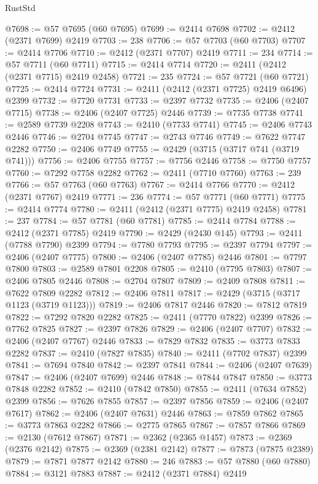 \begin{lexlean}{RustStd}
\begin{coremodule}
@7698 := @57 @7695 (@60 @7695)
@7699 := @2414 @7698
@7702 := @2412 (@2371 @7699) @2419
@7703 := 238
@7706 := @57 @7703 (@60 @7703)
@7707 := @2414 @7706
@7710 := @2412 (@2371 @7707) @2419
@7711 := 234
@7714 := @57 @7711 (@60 @7711)
@7715 := @2414 @7714
@7720 := @2411 (@2412 (@2371 @7715) @2419 @2458)
@7721 := 235
@7724 := @57 @7721 (@60 @7721)
@7725 := @2414 @7724
@7731 := @2411 (@2412 (@2371 @7725) @2419 @6496) @2399
@7732 := @7720 @7731
@7733 := @2397 @7732
@7735 := @2406 (@2407 @7715)
@7738 := @2406 (@2407 @7725) @2446
@7739 := @7735 @7738
@7741 := @2589 @7739 @2208
@7743 := @2410 (@7733 @7741)
@7745 := @2406 @7743 @2446
@7746 := @2704 @7745
@7747 := @2743 @7746
@7749 := @7622 @7747 @2282
@7750 := @2406 @7749
@7755 := @2429 (@3715 (@3717 @741 (@3719 @741)))
@7756 := @2406 @7755
@7757 := @7756 @2446
@7758 := @7750 @7757
@7760 := @7292 @7758 @2282
@7762 := @2411 (@7710 @7760)
@7763 := 239
@7766 := @57 @7763 (@60 @7763)
@7767 := @2414 @7766
@7770 := @2412 (@2371 @7767) @2419
@7771 := 236
@7774 := @57 @7771 (@60 @7771)
@7775 := @2414 @7774
@7780 := @2411 (@2412 (@2371 @7775) @2419 @2458)
@7781 := 237
@7784 := @57 @7781 (@60 @7781)
@7785 := @2414 @7784
@7788 := @2412 (@2371 @7785) @2419
@7790 := @2429 (@2430 @145)
@7793 := @2411 (@7788 @7790) @2399
@7794 := @7780 @7793
@7795 := @2397 @7794
@7797 := @2406 (@2407 @7775)
@7800 := @2406 (@2407 @7785) @2446
@7801 := @7797 @7800
@7803 := @2589 @7801 @2208
@7805 := @2410 (@7795 @7803)
@7807 := @2406 @7805 @2446
@7808 := @2704 @7807
@7809 := @2409 @7808
@7811 := @7622 @7809 @2282
@7812 := @2406 @7811
@7817 := @2429 (@3715 (@3717 @1123 (@3719 @1123)))
@7819 := @2406 @7817 @2446
@7820 := @7812 @7819
@7822 := @7292 @7820 @2282
@7825 := @2411 (@7770 @7822) @2399
@7826 := @7762 @7825
@7827 := @2397 @7826
@7829 := @2406 (@2407 @7707)
@7832 := @2406 (@2407 @7767) @2446
@7833 := @7829 @7832
@7835 := @3773 @7833 @2282
@7837 := @2410 (@7827 @7835)
@7840 := @2411 (@7702 @7837) @2399
@7841 := @7694 @7840
@7842 := @2397 @7841
@7844 := @2406 (@2407 @7639)
@7847 := @2406 (@2407 @7699) @2446
@7848 := @7844 @7847
@7850 := @3773 @7848 @2282
@7852 := @2410 (@7842 @7850)
@7855 := @2411 (@7634 @7852) @2399
@7856 := @7626 @7855
@7857 := @2397 @7856
@7859 := @2406 (@2407 @7617)
@7862 := @2406 (@2407 @7631) @2446
@7863 := @7859 @7862
@7865 := @3773 @7863 @2282
@7866 := @2775 @7865
@7867 := @7857 @7866
@7869 := @2130 (@7612 @7867)
@7871 := @2362 (@2365 @1457)
@7873 := @2369 (@2376 @2142)
@7875 := @2369 (@2381 @2142)
@7877 := @7873 (@7875 @2389)
@7879 := @7871 @7877 @2142
@7880 := 246
@7883 := @57 @7880 (@60 @7880)
@7884 := @3121 @7883
@7887 := @2412 (@2371 @7884) @2419

\end{coremodule}
\end{lexlean}

